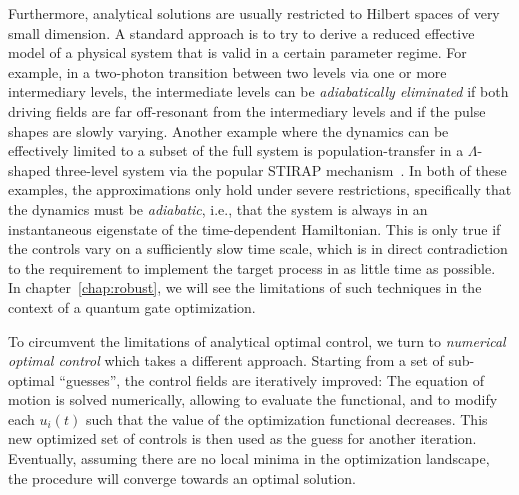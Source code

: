 Furthermore, analytical solutions are usually restricted to Hilbert spaces of very
small dimension. A standard approach is to try to derive a
reduced effective model of a physical system that is valid in a certain
parameter regime. For example, in a two-photon transition between two levels via
one or more intermediary levels, the intermediate levels can be
\emph{adiabatically eliminated} if both driving fields are far off-resonant
%
from the intermediary levels and if the pulse shapes are slowly varying. Another
example where the dynamics can be effectively limited to a subset
of the full system is population-transfer in a $\Lambda$-shaped
three-level system via the popular STIRAP mechanism~\cite{VitanovARPC2001}.
%
In both of these examples, the approximations only hold under severe
restrictions, specifically that the dynamics
must be \emph{adiabatic}, i.e., that the system is always in an instantaneous
eigenstate of the time-dependent Hamiltonian.
This is only true if the controls vary on a sufficiently slow time scale, which
is in direct contradiction to the requirement to implement the target process
in as little time as possible.
In chapter~\ref{chap:robust}, we will see the limitations of such techniques in
the context of a quantum gate optimization.

To circumvent the limitations of analytical optimal control, we turn to
\emph{numerical optimal control}
%
which takes a different approach.  Starting from a set of sub-optimal
``guesses'', the control fields are
iteratively improved: The equation of motion is solved numerically, allowing
to evaluate the functional, and to modify each
$u_i(t)$ such that the value of the optimization functional decreases. This new
optimized set of controls is then used as the guess for another iteration.
Eventually, assuming there are no local minima in the optimization landscape,
the procedure will converge towards an optimal solution.


